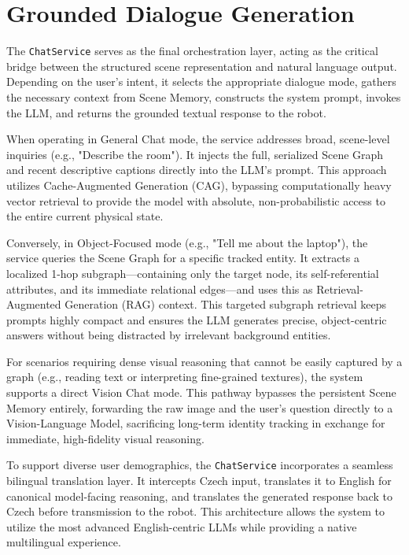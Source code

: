 \section{Grounded Dialogue Generation}
\label{sec:grounded_dialogue}

The \texttt{ChatService} serves as the final orchestration layer, acting as the critical bridge between the structured scene representation and natural language output. Depending on the user's intent, it selects the appropriate dialogue mode, gathers the necessary context from Scene Memory, constructs the system prompt, invokes the LLM, and returns the grounded textual response to the robot.

When operating in General Chat mode, the service addresses broad, scene-level inquiries (e.g., "Describe the room"). It injects the full, serialized Scene Graph and recent descriptive captions directly into the LLM's prompt. This approach utilizes Cache-Augmented Generation (CAG), bypassing computationally heavy vector retrieval to provide the model with absolute, non-probabilistic access to the entire current physical state.

Conversely, in Object-Focused mode (e.g., "Tell me about the laptop"), the service queries the Scene Graph for a specific tracked entity. It extracts a localized 1-hop subgraph---containing only the target node, its self-referential attributes, and its immediate relational edges---and uses this as Retrieval-Augmented Generation (RAG) context. This targeted subgraph retrieval keeps prompts highly compact and ensures the LLM generates precise, object-centric answers without being distracted by irrelevant background entities.

For scenarios requiring dense visual reasoning that cannot be easily captured by a graph (e.g., reading text or interpreting fine-grained textures), the system supports a direct Vision Chat mode. This pathway bypasses the persistent Scene Memory entirely, forwarding the raw image and the user's question directly to a Vision-Language Model, sacrificing long-term identity tracking in exchange for immediate, high-fidelity visual reasoning.

To support diverse user demographics, the \texttt{ChatService} incorporates a seamless bilingual translation layer. It intercepts Czech input, translates it to English for canonical model-facing reasoning, and translates the generated response back to Czech before transmission to the robot. This architecture allows the system to utilize the most advanced English-centric LLMs while providing a native multilingual experience.

